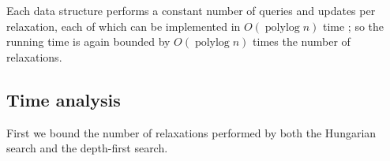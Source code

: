 \documentclass[a4paper,UKenglish]{socg-lipics-v2018}
\def\polylog{\mathop{\mathrm{polylog}}}
\theoremstyle{plain}
\numberwithin{figure}{section}
\begin{document}
Each data structure performs a constant number of queries and updates per relaxation, each of which can be implemented in $O(\polylog n)$ time \cite{}; so the running time is again bounded by
$O(\polylog n)$ times the number of relaxations.


\subsection{Time analysis}

First we bound the number of relaxations performed by both the Hungarian search and the depth-first search.
\end{document}
